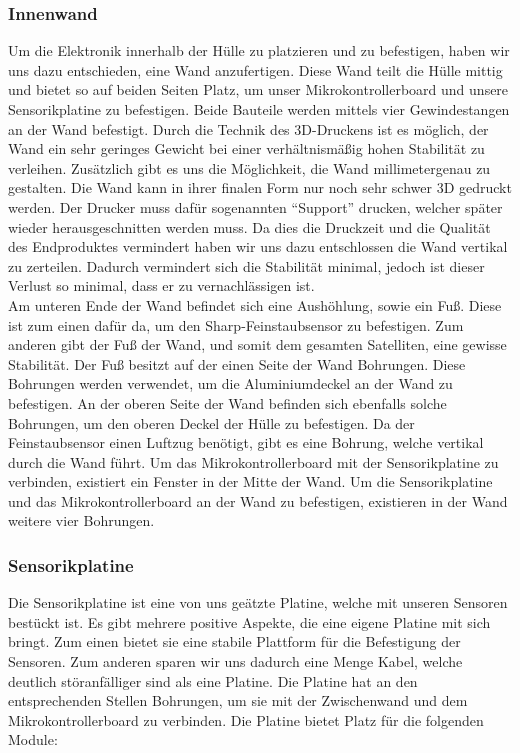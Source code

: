 \subsubsection{Innenwand}
Um die Elektronik innerhalb der Hülle zu platzieren und zu befestigen, haben wir uns dazu entschieden, eine Wand anzufertigen. Diese Wand teilt die Hülle mittig und bietet so auf beiden Seiten Platz, um unser Mikrokontrollerboard und unsere Sensorikplatine zu befestigen. Beide Bauteile werden mittels vier Gewindestangen an der Wand befestigt. Durch die Technik des 3D-Druckens ist es möglich, der Wand ein sehr geringes Gewicht bei einer verhältnismäßig hohen Stabilität zu verleihen. Zusätzlich gibt es uns die Möglichkeit, die Wand millimetergenau zu gestalten. Die Wand kann in ihrer finalen Form nur noch sehr schwer 3D gedruckt werden. Der Drucker muss dafür sogenannten ``Support'' drucken, welcher später wieder herausgeschnitten werden muss. Da dies die Druckzeit und die Qualität des Endproduktes vermindert haben wir uns dazu entschlossen die Wand vertikal zu zerteilen. Dadurch vermindert sich die Stabilität minimal, jedoch ist dieser Verlust so minimal, dass er zu vernachlässigen ist.\\

Am unteren Ende der Wand befindet sich eine Aushöhlung, sowie ein Fuß. Diese ist zum einen dafür da, um den Sharp-Feinstaubsensor zu befestigen. Zum anderen gibt der Fuß der Wand, und somit dem gesamten Satelliten, eine gewisse Stabilität. Der Fuß besitzt auf der einen Seite der Wand Bohrungen. Diese Bohrungen werden verwendet, um die Aluminiumdeckel an der Wand zu befestigen. An der oberen Seite der Wand befinden sich ebenfalls solche Bohrungen, um den oberen Deckel der Hülle zu befestigen. Da der Feinstaubsensor einen Luftzug benötigt, gibt es eine Bohrung, welche vertikal durch die Wand führt. Um das Mikrokontrollerboard mit der Sensorikplatine zu verbinden, existiert ein Fenster in der Mitte der Wand. Um die Sensorikplatine und das Mikrokontrollerboard an der Wand zu befestigen, existieren in der Wand weitere vier Bohrungen.

\subsubsection{Sensorikplatine}
Die Sensorikplatine ist eine von uns geätzte Platine, welche mit unseren Sensoren bestückt ist. Es gibt mehrere positive Aspekte, die eine eigene Platine mit sich bringt. Zum einen bietet sie eine stabile Plattform für die Befestigung der Sensoren. Zum anderen sparen wir uns dadurch eine Menge Kabel, welche deutlich störanfälliger sind als eine Platine. Die Platine hat an den entsprechenden Stellen Bohrungen, um sie mit der Zwischenwand und dem Mikrokontrollerboard zu verbinden. Die Platine bietet Platz für die folgenden Module:

